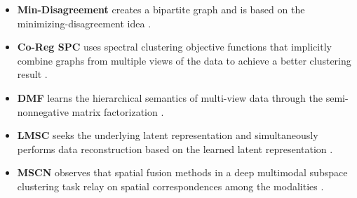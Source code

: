 \documentclass[journal]{IEEEtran}
\begin{document}
\begin{itemize}
  \item {\textbf{Min-Disagreement}} creates a bipartite graph and is based on the minimizing-disagreement idea \cite{Sa2005SpectralCW}.
  \item {\textbf{Co-Reg SPC}} uses spectral clustering objective functions that implicitly combine graphs from multiple views of the data to achieve a better clustering result \cite{Kumar2011CoregularizedMS}.
  \item {\textbf{DMF}} learns the hierarchical semantics of multi-view data through the semi-nonnegative matrix factorization \cite{Zhao2017MultiViewCV}.
  \item {\textbf{LMSC}} seeks the underlying latent representation and simultaneously performs data reconstruction based on the learned latent representation \cite{Zhang2017LatentMS}.
  \item {\textbf{MSCN}} observes that spatial fusion methods in a deep
multimodal subspace clustering task relay on spatial correspondences among the modalities \cite{Abavisani2018DeepMS}.
\end{itemize}
\end{document}
